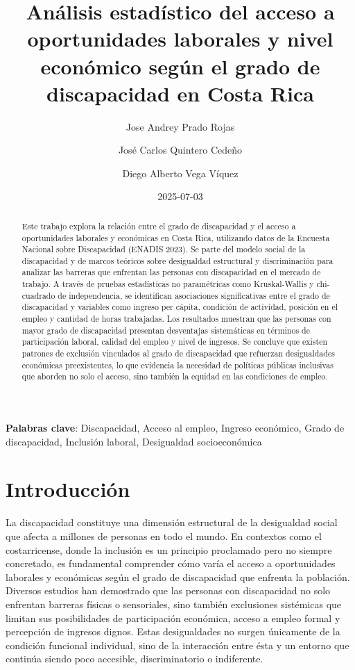\documentclass[
  11pt,
  oneside]{article}
\title{Análisis estadístico del acceso a oportunidades laborales y nivel
económico según el grado de discapacidad en Costa Rica}
\author{Jose Andrey Prado Rojas \and José Carlos Quintero
Cedeño \and Diego Alberto Vega Víquez}
\date{2025-07-03}
\begin{document}
\maketitle
\begin{abstract}
Este trabajo explora la relación entre el grado de discapacidad y el
acceso a oportunidades laborales y económicas en Costa Rica, utilizando
datos de la Encuesta Nacional sobre Discapacidad (ENADIS 2023). Se parte
del modelo social de la discapacidad y de marcos teóricos sobre
desigualdad estructural y discriminación para analizar las barreras que
enfrentan las personas con discapacidad en el mercado de trabajo. A
través de pruebas estadísticas no paramétricas como Kruskal-Wallis y
chi-cuadrado de independencia, se identifican asociaciones
significativas entre el grado de discapacidad y variables como ingreso
per cápita, condición de actividad, posición en el empleo y cantidad de
horas trabajadas. Los resultados muestran que las personas con mayor
grado de discapacidad presentan desventajas sistemáticas en términos de
participación laboral, calidad del empleo y nivel de ingresos. Se
concluye que existen patrones de exclusión vinculados al grado de
discapacidad que refuerzan desigualdades económicas preexistentes, lo
que evidencia la necesidad de políticas públicas inclusivas que aborden
no solo el acceso, sino también la equidad en las condiciones de empleo.
\end{abstract}


\textbf{Palabras clave}: Discapacidad, Acceso al empleo, Ingreso
económico, Grado de discapacidad, Inclusión laboral, Desigualdad
socioeconómica

\section{Introducción}\label{introducciuxf3n}

La discapacidad constituye una dimensión estructural de la desigualdad
social que afecta a millones de personas en todo el mundo. En contextos
como el costarricense, donde la inclusión es un principio proclamado
pero no siempre concretado, es fundamental comprender cómo varía el
acceso a oportunidades laborales y económicas según el grado de
discapacidad que enfrenta la población. Diversos estudios han demostrado
que las personas con discapacidad no solo enfrentan barreras físicas o
sensoriales, sino también exclusiones sistémicas que limitan sus
posibilidades de participación económica, acceso a empleo formal y
percepción de ingresos dignos. Estas desigualdades no surgen únicamente
de la condición funcional individual, sino de la interacción entre ésta
y un entorno que continúa siendo poco accesible, discriminatorio o
indiferente.
\end{document}
